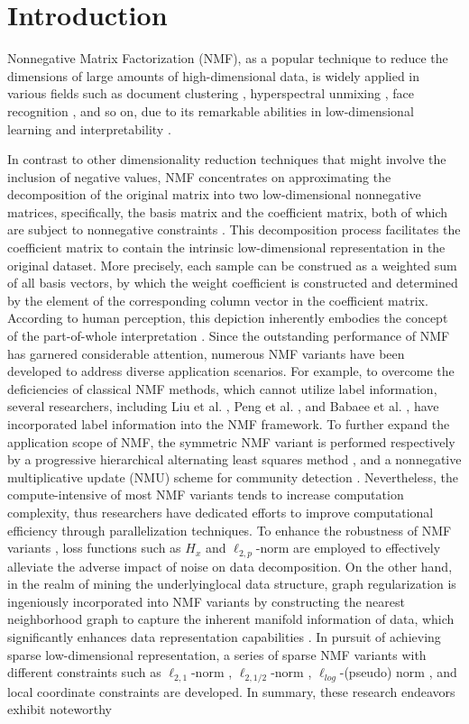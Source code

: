 \documentclass[a4paper,fleqn]{cas-sc}
\begin{document}
\section{Introduction}
\label{Introduction}

Nonnegative Matrix Factorization (NMF), as a popular technique to reduce the dimensions of large amounts of high-dimensional data, is widely applied in various fields such as document clustering \cite{2}, hyperspectral unmixing \cite{3,4}, face recognition \cite{5,6}, and so on, due to its remarkable abilities in low-dimensional learning and interpretability \cite{1}.

In contrast to other dimensionality reduction techniques that might involve the inclusion of negative values, NMF concentrates on approximating the decomposition of the original matrix into two low-dimensional nonnegative matrices, specifically, the basis matrix and the coefficient matrix, both of which are subject to nonnegative constraints \cite{7}. This decomposition process facilitates the coefficient matrix to contain the intrinsic low-dimensional representation in the original dataset. More precisely, each sample can be construed as a weighted sum of all basis vectors, by which the weight coefficient is constructed and determined by the element of the corresponding column vector in the coefficient matrix. According to human perception, this depiction inherently embodies the concept of the part-of-whole interpretation \cite{8}. Since the outstanding performance of NMF has garnered considerable attention, numerous NMF variants have been developed to address diverse application scenarios. For example, to overcome the deficiencies of classical NMF methods, which cannot utilize label information, several researchers, including Liu et al. \cite{9}, Peng et al. \cite{10}, and Babaee et al. \cite{11}, have incorporated label information into the NMF framework. To further expand the application scope of NMF, the symmetric NMF variant is performed respectively by a progressive hierarchical alternating least squares method \cite{12}, and a nonnegative multiplicative update (NMU) scheme for community detection \cite{13}. Nevertheless, the compute-intensive of most NMF variants tends to increase computation complexity, thus  researchers \cite{14,15} have dedicated efforts to improve computational efficiency through parallelization techniques. To enhance the robustness of NMF variants \cite{16,17,18}, loss functions such as $H_x$ and $\ell_{2,p}$-norm are employed to effectively alleviate the adverse impact of noise on data decomposition. On the other hand, in the realm of mining the underlyinglocal data structure, graph regularization is ingeniously incorporated into NMF variants by constructing the nearest neighborhood graph to capture the inherent manifold information of data, which significantly enhances data representation capabilities \cite{19,20,21,51,53}. In pursuit of achieving sparse low-dimensional representation, a series of sparse NMF variants with different constraints such as $\ell_{2,1}$-norm \cite{22}, $\ell_{2,1/2}$-norm \cite{23}, $\ell_{log}$-(pseudo) norm \cite{38}, and local coordinate constraints \cite{24} are developed. In summary, these research endeavors exhibit noteworthy 
\end{document}
